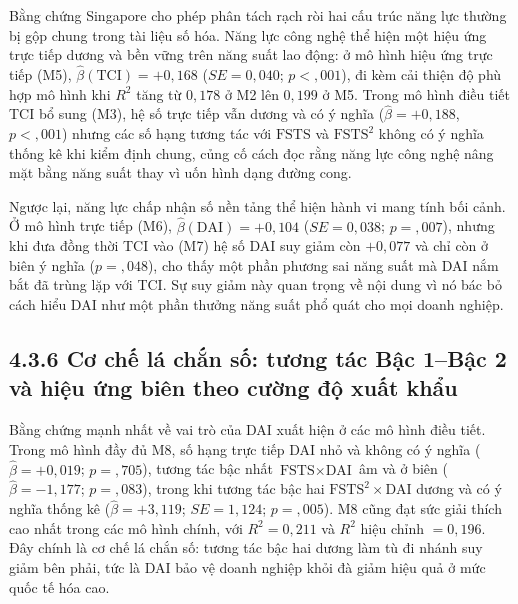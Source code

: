 \documentclass[
  a4paper,
  13pt]{extreport}
\begin{document}
Bằng chứng Singapore cho phép phân tách rạch ròi hai cấu trúc năng lực
thường bị gộp chung trong tài liệu số hóa. Năng lực công nghệ thể hiện
một hiệu ứng trực tiếp dương và bền vững trên năng suất lao động: ở mô
hình hiệu ứng trực tiếp (M5), \(\hat{\beta}(\text{TCI}) = +0{,}168\)
(\(SE = 0{,}040\); \(p < {,}001\)), đi kèm cải thiện độ phù hợp mô hình
khi \(R^2\) tăng từ \(0{,}178\) ở M2 lên \(0{,}199\) ở M5. Trong mô hình
điều tiết TCI bổ sung (M3), hệ số trực tiếp vẫn dương và có ý nghĩa
(\(\hat{\beta} = +0{,}188\), \(p < {,}001\)) nhưng các số hạng tương tác
với \(\text{FSTS}\) và \(\text{FSTS}^2\) không có ý nghĩa thống kê khi
kiểm định chung, củng cố cách đọc rằng năng lực công nghệ nâng mặt bằng
năng suất thay vì uốn hình dạng đường cong.

Ngược lại, năng lực chấp nhận số nền tảng thể hiện hành vi mang tính bối
cảnh. Ở mô hình trực tiếp (M6), \(\hat{\beta}(\text{DAI}) = +0{,}104\)
(\(SE = 0{,}038\); \(p = {,}007\)), nhưng khi đưa đồng thời TCI vào (M7)
hệ số DAI suy giảm còn \(+0{,}077\) và chỉ còn ở biên ý nghĩa
(\(p = {,}048\)), cho thấy một phần phương sai năng suất mà DAI nắm bắt
đã trùng lặp với TCI. Sự suy giảm này quan trọng về nội dung vì nó bác
bỏ cách hiểu DAI như một phần thưởng năng suất phổ quát cho mọi doanh
nghiệp.

\hypertarget{cux1a1-chux1ebf-luxe1-chux1eafn-sux1ed1-tux1b0ux1a1ng-tuxe1c-bux1eadc-1bux1eadc-2-vuxe0-hiux1ec7u-ux1ee9ng-biuxean-theo-cux1b0ux1eddng-ux111ux1ed9-xuux1ea5t-khux1ea9u}{%
\subsection{4.3.6 Cơ chế lá chắn số: tương tác Bậc 1--Bậc 2 và hiệu ứng
biên theo cường độ xuất
khẩu}\label{cux1a1-chux1ebf-luxe1-chux1eafn-sux1ed1-tux1b0ux1a1ng-tuxe1c-bux1eadc-1bux1eadc-2-vuxe0-hiux1ec7u-ux1ee9ng-biuxean-theo-cux1b0ux1eddng-ux111ux1ed9-xuux1ea5t-khux1ea9u}}

Bằng chứng mạnh nhất về vai trò của DAI xuất hiện ở các mô hình điều
tiết. Trong mô hình đầy đủ M8, số hạng trực tiếp DAI nhỏ và không có ý
nghĩa (\(\hat{\beta} = +0{,}019\); \(p = {,}705\)), tương tác bậc nhất
\(\text{FSTS} \times \text{DAI}\) âm và ở biên
(\(\hat{\beta} = -1{,}177\); \(p = {,}083\)), trong khi tương tác bậc
hai \(\text{FSTS}^2 \times \text{DAI}\) dương và có ý nghĩa thống kê
(\(\hat{\beta} = +3{,}119\); \(SE = 1{,}124\); \(p = {,}005\)). M8 cũng
đạt sức giải thích cao nhất trong các mô hình chính, với
\(R^2 = 0{,}211\) và \(R^2\) hiệu chỉnh \(= 0{,}196\). Đây chính là cơ
chế lá chắn số: tương tác bậc hai dương làm tù đi nhánh suy giảm bên
phải, tức là DAI bảo vệ doanh nghiệp khỏi đà giảm hiệu quả ở mức quốc tế
hóa cao.
\end{document}
